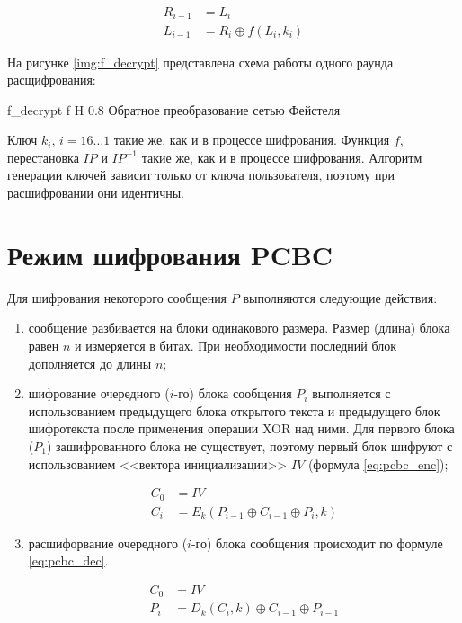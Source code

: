 \begin{equation}
	\label{eq:round}
	\begin{aligned}
		R_{i-1} &= L_{i} \\
		L_{i-1} &= R_{i} \oplus f(L_{i}, k_i)
	\end{aligned}
\end{equation}

На рисунке \ref{img:f_decrypt} представлена схема работы одного раунда расщифрования:

{f_decrypt} %
{f} %
{H} %
{0.8\textwidth} %
{Обратное преобразование сетью Фейстеля} %

Ключ $k_i$, $i=16\ldots1$ такие же, как и в процессе шифрования. Функция $f$, перестановка $IP$ и $IP^{-1}$ такие же, как и в процессе шифрования. Алгоритм генерации ключей зависит только от ключа пользователя, поэтому при расшифровании они идентичны.

\section{Режим шифрования PCBC}

Для шифрования некоторого сообщения $P$ выполняются следующие действия:

\begin{enumerate}
	\item сообщение разбивается на блоки одинакового размера. Размер (длина) блока равен $n$ и измеряется в битах. При необходимости последний блок дополняется до длины $n$;
	\item шифрование очередного ($i$-го) блока сообщения $P_i$ выполняется с использованием предыдущего  блока открытого текста и предыдущего блок шифротекста  после применения операции XOR над ними. Для первого блока ($P_1$) зашифрованного блока не существует, поэтому первый блок шифруют с использованием <<вектора инициализации>> $IV$ (формула \ref{eq:pcbc_enc});
	
	\begin{equation}
		\label{eq:pcbc_enc}
		\begin{aligned}
			C_0 &= IV \\
			C_i &= E_k(P_{i-1} \oplus C_{i-1} \oplus P_{i}, k)
		\end{aligned}
	\end{equation}
	
	\item расшифорвание очередного ($i$-го) блока сообщения происходит по формуле \ref{eq:pcbc_dec}.
	
	\begin{equation}
		\label{eq:pcbc_dec}
		\begin{aligned}
			C_0 &= IV \\
			P_i &= D_k(C_{i}, k) \oplus C_{i-1} \oplus P_{i-1}
		\end{aligned}
	\end{equation}
\end{enumerate}

